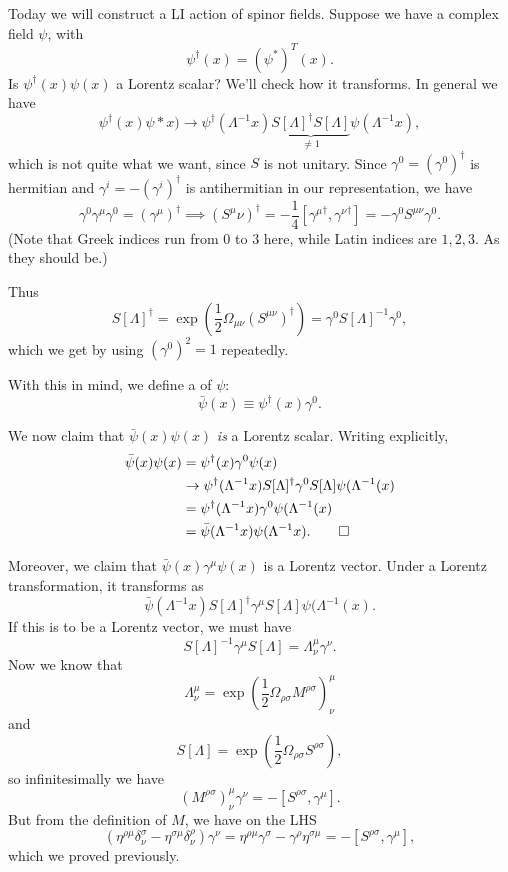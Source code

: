 Today we will construct a LI action of spinor fields. Suppose we have a complex field $\psi$, with
$$\psi^\dagger(x)=(\psi^*)^T(x).$$
Is $\psi^\dagger(x) \psi(x)$ a Lorentz scalar? We'll check how it transforms. In general we have
$$\psi^\dagger(x)\psi*x) \to \psi^\dagger(\Lambda^{-1}x)\underbrace{S[\Lambda]^\dagger S[\Lambda]}_{\neq 1}\psi(\Lambda^{-1}x),$$
which is not quite what we want, since $S$ is not unitary. Since $\gamma^0=(\gamma^0)^\dagger$ is hermitian and $\gamma^i=-(\gamma^i)^\dagger$ is antihermitian in our representation, we have
$$\gamma^0 \gamma^\mu \gamma^0=(\gamma^\mu)^\dagger\implies (S^\mu\nu)^\dagger =-\frac{1}{4}[{\gamma^\mu}^\dagger,{\gamma^\nu}^\dagger]=-\gamma^0 S^{\mu\nu}\gamma^0.$$
(Note that Greek indices run from $0$ to $3$ here, while Latin indices are $1,2,3$. As they should be.)

Thus
$$S[\Lambda]^\dagger=\exp(\frac{1}{2} \Omega_{\mu\nu}(S^{\mu\nu})^\dagger)=\gamma^0 S[\Lambda]^{-1}\gamma^0,$$
which we get by using $(\gamma^0)^2=1$ repeatedly. 
\begin{defn}
With this in mind, we define a  of $\psi$:
$$\bar\psi(x)\equiv \psi^\dagger(x) \gamma^0.$$
\end{defn}
We now claim that $\bar \psi(x)\psi(x)$ \emph{is} a Lorentz scalar. Writing explicitly,
\begin{align*}
    \bar \psi(x)\psi(x) &= \psi^\dagger(x) \gamma^0 \psi(x)\\
    &\to \psi^\dagger(\Lambda^{-1}x)S[\Lambda]^\dagger \gamma^0 S[\Lambda]\psi(\Lambda^{-1}(x)\\
    &=\psi^\dagger(\Lambda^{-1}x) \gamma^0 \psi(\Lambda^{-1}(x)\\
    &= \bar \psi(\Lambda^{-1}x)\psi(\Lambda^{-1}x). \qed
\end{align*}

Moreover, we claim that $\bar\psi(x)\gamma^\mu \psi(x)$ is a Lorentz vector. Under a Lorentz transformation, it transforms as
$$\bar\psi(\Lambda^{-1}x)S[\Lambda]^\dagger \gamma^\mu S[\Lambda]\psi(\Lambda^{-1}(x).$$
If this is to be a Lorentz vector, we must have
$$S[\Lambda]^{-1} \gamma^\mu S[\Lambda]=\Lambda^\mu_\nu \gamma^\nu.$$
Now we know that
$$\Lambda^\mu_\nu = \exp\left(\frac{1}{2}\Omega_{\rho\sigma}M^{\rho\sigma}\right)^\mu_\nu$$
and
$$S[\Lambda]=\exp\left(\frac{1}{2}\Omega_{\rho\sigma}S^{\rho\sigma}\right),$$
so infinitesimally we have
$$(M^{\rho\sigma})^\mu_\nu \gamma^\nu = -[S^{\rho\sigma},\gamma^\mu].$$ But from the definition of $M$, we have on the LHS
$$(\eta^{\rho\mu}\delta^\sigma_\nu-\eta^{\sigma\mu}\delta^\rho_\nu)\gamma^\nu =\eta^{\rho\mu}\gamma^\sigma - \gamma^\rho \eta^{\sigma\mu}=-[S^{\rho\sigma},\gamma^\mu],$$
which we proved previously.


